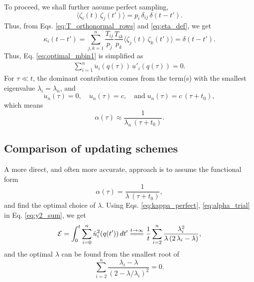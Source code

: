 \documentclass[reprint]{revtex4-1}
\begin{document}
To proceed, we shall further assume perfect sampling,
%
\begin{equation}
  \langle \zeta_i(t) \, \zeta_j(t') \rangle
  =
  p_i \, \delta_{ij} \, \delta(t - t').
  \label{eq:zz_perfect}
\end{equation}
%
Thus, from Eqs. \eqref{eq:T_orthonormal_rows} and \eqref{eq:eta_def},
we get
%
\begin{equation}
  \kappa_i(t - t')
  =
  \sum_{j,k = 1}^n
  \frac{ T_{ij} } { p_j }
  \frac{ T_{ik} } { p_k }
  \langle \zeta_j(t) \, \zeta_k(t') \rangle
  =
  \delta(t - t').
  \label{eq:kappa_perfect}
\end{equation}
%
Thus, Eq. \eqref{eq:optimal_mbin1}
is simplified as
%
\begin{align}
  \sum_{i=1}^n
  \ddot u_i(q(\tau)) \, u'_i(q(\tau)) = 0.
  \label{eq:optimal_mbin2}
\end{align}
%
%
For $\tau \ll t$,
the dominant contribution comes from
the term(s) with the smallest eigenvalue $\lambda_i = \lambda_n$,
and
$$
\ddot u_n(\tau) = 0,
\quad
\dot u_n(\tau) = c,
\quad
\mathrm{and}\;
u_n(\tau) = c \, (\tau + t_0),
$$
which means
$$
\alpha(\tau) \approx \frac{1}{\lambda_n \, (\tau + t_0)}.
$$



\subsection{Comparison of updating schemes}



A more direct, and often more accurate, approach
is to assume the functional form
\begin{equation}
\alpha(\tau) = \frac{1}{\lambda \, (\tau + t_0) },
\label{eq:alpha_trial}
\end{equation}
and find the optimal choice of $\lambda$.
%
Using Eqs. \eqref{eq:kappa_perfect}, \eqref{eq:alpha_trial}
in Eq. \eqref{eq:y2_sum}, we get
%
\begin{equation}
\mathcal E
=
\int_0^t
\sum_{i=0}^n \dot u_i^2(q(t')) \, dt'
\stackrel{t \to \infty}
{=\joinrel=\joinrel=}
\frac{1}{t}
\sum_{i = 2}^n
\frac{ \lambda_i^2 } { \lambda \, (2 \, \lambda_i - \lambda) },
\label{eq:y2_sum_perfect_invt}
\end{equation}
%
and the optimal $\lambda$
can be found from the smallest root of
%
\begin{equation}
\sum_{i = 2}^n
\frac{ \lambda_i - \lambda }
{ \left(2 - \lambda/ \lambda_i \right)^2 }
= 0.
\end{equation}
\end{document}
